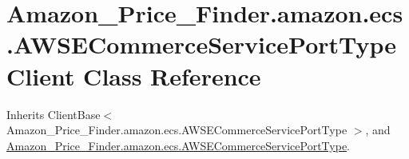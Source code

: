 \hypertarget{class_amazon___price___finder_1_1amazon_1_1ecs_1_1_a_w_s_e_commerce_service_port_type_client}{\section{Amazon\-\_\-\-Price\-\_\-\-Finder.\-amazon.\-ecs.\-A\-W\-S\-E\-Commerce\-Service\-Port\-Type\-Client Class Reference}
\label{class_amazon___price___finder_1_1amazon_1_1ecs_1_1_a_w_s_e_commerce_service_port_type_client}
}


Inherits Client\-Base$<$ Amazon\-\_\-\-Price\-\_\-\-Finder.\-amazon.\-ecs.\-A\-W\-S\-E\-Commerce\-Service\-Port\-Type $>$, and \hyperlink{interface_amazon___price___finder_1_1amazon_1_1ecs_1_1_a_w_s_e_commerce_service_port_type}{Amazon\-\_\-\-Price\-\_\-\-Finder.\-amazon.\-ecs.\-A\-W\-S\-E\-Commerce\-Service\-Port\-Type}.

